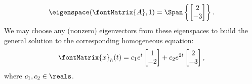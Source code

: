 {\begin{align*}
\eigenspace(\fontMatrix{A},1)
=
\Span\left\{
\begin{bmatrix}%
2	\\
-3
\end{bmatrix}%
\right\}.
\end{align*}
We may choose any (nonzero) eigenvectors from these eigenspaces to build the general solution to the corresponding homogeneous equation:
\begin{align*}
\fontMatrix{x}_{h}(t)
=
c_{1} e^{t}
\begin{bmatrix}%
1	\\
-2
\end{bmatrix}%
+
c_{2} e^{2 t}
\begin{bmatrix}%
2	\\
-3
\end{bmatrix}%
,
\end{align*}
where $c_{1},c_{2} \in \reals$.

}
